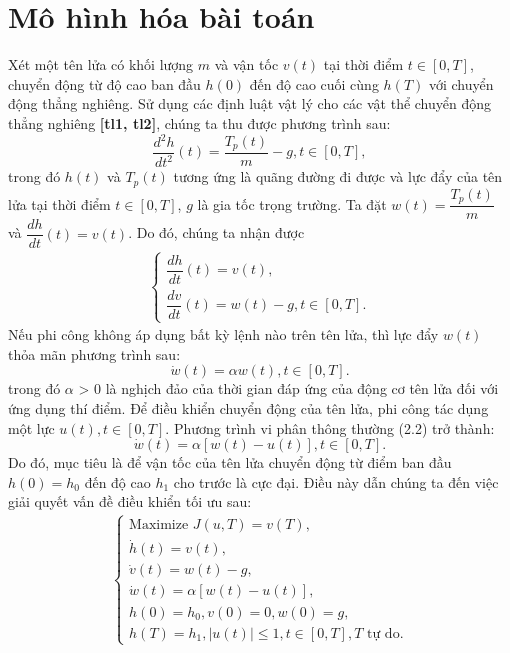 \documentclass[12pt,a4paper]{report}
\begin{document}
	\section{Mô hình hóa bài toán}
	Xét một tên lửa có khối lượng $m$ và vận tốc $v(t)$ tại thời điểm $t \in [0, T]$, chuyển động từ độ cao ban đầu $h(0)$ đến độ cao cuối cùng $h(T)$ với chuyển động thẳng nghiêng. Sử dụng các định luật vật lý cho các vật thể chuyển động thẳng nghiêng \textbf{[tl1, tl2]}, chúng ta thu được phương trình sau:
	$$\dfrac{d^2h}{dt^2}(t) = \dfrac{T_p(t)}{m} - g, t \in [0, T],$$
	trong đó $h(t)$ và $T_p(t)$ tương ứng là quãng đường đi được và lực đẩy của tên lửa tại thời điểm $t\in[0, T]$, $g$ là gia tốc trọng trường. Ta đặt $w(t) = \dfrac{T_p(t)}{m}$ và $\dfrac{dh}{dt}(t) = v(t)$. Do đó, chúng ta nhận được
	\begin{eqnarray}
		\begin{cases}
			\dfrac{dh}{dt}(t) = v(t), \\ \dfrac{dv}{dt}(t) = w(t) - g, t \in [0, T].
		\end{cases}
	\end{eqnarray}
	Nếu phi công không áp dụng bất kỳ lệnh nào trên tên lửa, thì lực đẩy $w(t)$ thỏa mãn phương trình sau:
	\begin{equation}
		\dot{w}(t) = \alpha w(t), t \in [0, T].
	\end{equation} trong đó $\alpha$ > 0 là nghịch đảo của thời gian đáp ứng của động cơ tên lửa đối với ứng dụng thí điểm. Để điều khiển chuyển động của tên lửa, phi công tác dụng một lực $u(t), t \in [0, T]$. Phương trình vi phân thông thường (2.2) trở thành: \begin{equation}
	\dot{w}(t) = \alpha[w(t) - u(t)], t \in [0, T].
\end{equation}
Do đó, mục tiêu là để vận tốc của tên lửa chuyển động từ điểm ban đầu $h(0) = h_0$ đến độ cao $h_1$ cho trước là cực đại. Điều này dẫn chúng ta đến việc giải quyết vấn đề điều khiển tối ưu sau:
\begin{eqnarray}
	\begin{cases}
		\text{Maximize } J(u, T) = v(T), \\ \dot{h}(t) = v(t), \\ \dot{v}(t) = w(t) - g, \\ \dot{w}(t) = \alpha[w(t) - u(t)],\\ h(0) = h_0, v(0) = 0, w(0) = g, \\ h(T) = h_1, |u(t)| \leq 1, t \in [0, T], T \text{ tự do.}
	\end{cases}
\end{eqnarray}
\end{document}
